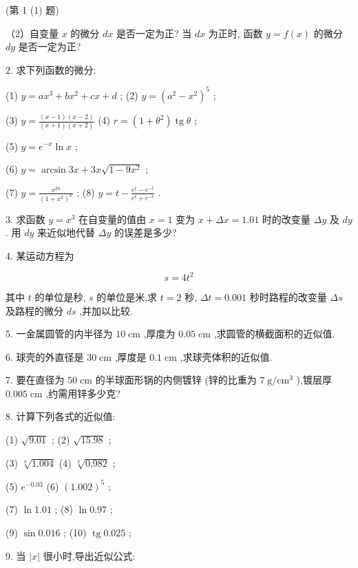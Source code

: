 \documentclass[10pt]{article}
\begin{document}
(第 1 (1) 题)

（2）自变量 \(x\) 的微分 \({dx}\) 是否一定为正? 当 \({dx}\) 为正时, 函数 \(y = f\left( x\right)\) 的微分 \({dy}\) 是否一定为正?

2. 求下列函数的微分:

(1) \(y = a{x}^{3} + b{x}^{2} + {cx} + d\) ; (2) \(y = {\left( {a}^{2} - {x}^{2}\right) }^{5}\) ;

(3) \(y = \frac{\left( {x - 1}\right) \left( {x - 2}\right) }{\left( {x + 1}\right) \left( {x + 2}\right) }\) (4) \(r = \left( {1 + {\theta }^{2}}\right) \operatorname{tg}\theta\) ;

(5) \(y = {e}^{-x}\ln x\) ;

(6) \(y = \arcsin {3x} + {3x}\sqrt{1 - 9{x}^{2}}\) ;

(7) \(y = \frac{{x}^{2n}}{{\left( 1 + {x}^{2}\right) }^{n}}\) ; (8) \(y = t - \frac{{e}^{t} - {e}^{-t}}{{e}^{t} + {e}^{-t}}\) .

3. 求函数 \(y = {x}^{3}\) 在自变量的值由 \(x = 1\) 变为 \(x + {\Delta x} = {1.01}\) 时的改变量 \({\Delta y}\) 及 \({dy}\) . 用 \({dy}\) 来近似地代替 \({\Delta y}\) 的误差是多少?

4. 某运动方程为

\[
s = 4{t}^{2}
\]

其中 \(t\) 的单位是秒, \(s\) 的单位是米,求 \(t = 2\) 秒, \({\Delta t} = {0.001}\) 秒时路程的改变量 \({\Delta s}\) 及路程的微分 \({ds}\) ,并加以比较.

5. 一金属圆管的内半径为 \({10}\mathrm{\;{cm}}\) ,厚度为 \({0.05}\mathrm{\;{cm}}\) ,求圆管的横截面积的近似值.

6. 球壳的外直径是 \({30}\mathrm{\;{cm}}\) ,厚度是 \({0.1}\mathrm{\;{cm}}\) ,求球壳体积的近似值.

7. 要在直径为 \({50}\mathrm{\;{cm}}\) 的半球面形锅的内侧镀锌 (锌的比重为 \(7\mathrm{\;g}/{\mathrm{{cm}}}^{3}\) ),镀层厚 \({0.005}\mathrm{\;{cm}}\) ,约需用锌多少克?

8. 计算下列各式的近似值:

(1) \(\sqrt{9.01}\) ; (2) \(\sqrt{15.98}\) ;

(3) \(\sqrt[3]{1.004}\) (4) \(\sqrt[3]{0.982}\) ;

(5) \({e}^{-{0.03}}\) (6) \({\left( {1.002}\right) }^{5}\) ;

(7) \(\ln {1.01}\) ; (8) \(\ln {0.97}\) ;

(9) \(\sin {0.016}\) ; (10) \(\operatorname{tg}{0.025}\) ;

9. 当 \(\left| x\right|\) 很小时,导出近似公式:
\end{document}
